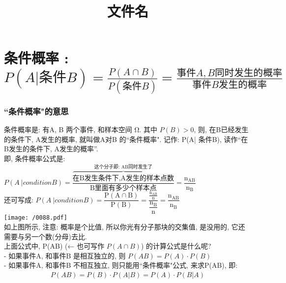 \documentclass[UTF8]{ctexart}
\title{文件名}
\begin{document}
	\tableofcontents %
	\date{} %
	\maketitle  %
	
	
	
	\part{条件概率 : $
		P(A|\text{条件}B)=\frac{P(A\cap B)}{P(\text{条件}B)}=\frac{\text{事件}A,B\text{同时发生的概率}}{\text{事件}B\text{发生的概率}}
		$}
	
	\section{``条件概率"的意思}
	
	条件概率是: 有A, B 两个事件, 和样本空间 Ω. 其中 $P(B) >0$, 则, 在B已经发生的条件下, A发生的概率, 就叫做A对B 的``条件概率". 记作:  P(A| 条件B), 读作``在B发生的条件下, A发生的概率”. \\
	
	即, 条件概率公式是: $
	P(A \ | condition B) =\dfrac{\overset{\text{这个分子即:\ AB同时发生了}}{\overbrace{\text{在B发生条件下,A发生的样本点数}}}}{\text{B里面有多少个样本点}}=\dfrac{\text{n}_{\text{AB}}}{\text{n}_{\text{B}}}
	$ \\
	
	还可写成:  $
	P(A \ | condition B) 
	=\dfrac{\text{P}\left( \text{A}\cap \text{B} \right)}{\text{P}\left( \text{B} \right)}
	=\dfrac{\frac{\text{n}_{\text{AB}}}{\text{n}}}{\dfrac{\text{n}_{\text{B}}}{\text{n}}}=\dfrac{\text{n}_{\text{AB}}}{\text{n}_{\text{B}}}
		$ \\
	
	\texttt{[image: /0088.pdf]} \\
	
	如上图所示, 注意: 概率是个比值, 所以你光有分子那块的交集值, 是没用的, 它还需要与另一个数(分母)去比. \\
	
	上面公式中, P(AB) (← 也可写作 $P(A \cap B)$) 的计算公式是什么呢? \\
	- 如果事件A, 和事件B 是相互独立的, 则 $P(AB) = P(A) \cdot P(B)$ \\
	- 如果事件A, 和事件B 不相互独立, 则只能用``条件概率"公式, 来求P(AB), 即: 
	\begin{align*}  %
\boxed{
	P(AB) =   P(B) \cdot P(A |B) = P(A)  \cdot P(B |A)
}
	\end{align*}
\\
	
\end{document}

